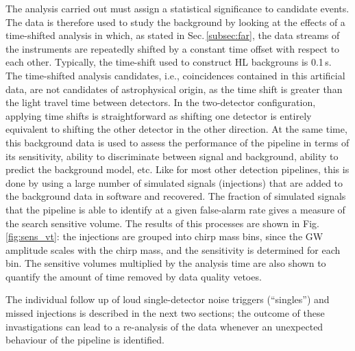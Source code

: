 \documentclass[binding=0.6cm, LaM]{sapthesis}
\begin{document}
	The analysis carried out must assign a statistical significance to candidate events.
        The data is therefore used to study the background by looking at the effects of a time-shifted analysis in which, 
	as stated in Sec.\,\ref{subsec:far}, the data streams of the instruments are repeatedly shifted by a constant time offset with respect to each other. 
	Typically, the time-shift used to construct HL backgrouns is 0.1\,s.
	The time-shifted analysis candidates, i.e., coincidences contained in this artificial data, 
	are not candidates of astrophysical origin, as the time shift is greater than the light travel time between detectors.
	In the two-detector configuration, applying time shifts is straightforward as shifting one detector 
	is entirely equivalent to shifting the other detector in the other direction. 
        At the same time, this background data is used to assess the performance of the pipeline in terms of its sensitivity, 
	ability to discriminate between signal and background, ability to predict the background model, etc. 
	Like for most other detection pipelines, this is done by using a large number of simulated signals (injections) that are added to the background data in software and recovered.
 	The fraction of simulated signals that the pipeline is able to identify at a given false-alarm rate gives a measure of the search sensitive volume.
	The results of this processes are shown in Fig.\,\ref{fig:sens_vt}: 
	the injections are grouped into chirp mass bins, since the GW amplitude scales with the chirp mass,
	and the sensitivity is determined for each bin.
	The sensitive volumes multiplied by the analysis time are also shown to quantify the amount of time removed by data quality vetoes.

        The individual follow up of loud single-detector noise triggers (``singles'') and missed injections is 
	described in the next two sections; the outcome of these invastigations can lead to a re-analysis of the data whenever an unexpected behaviour of the pipeline is identified. 
\end{document}
